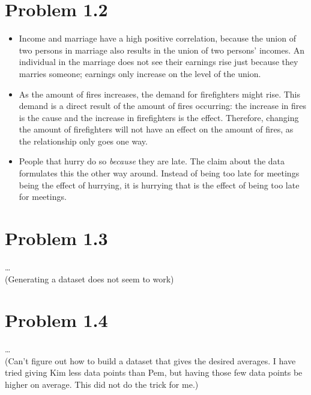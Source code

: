 \documentclass[a4paper]{article}
\begin{document}
\section*{Problem 1.2}
\begin{itemize}
    \item Income and marriage have a high positive correlation, because the union of two persons in marriage also results in the union of two persons' incomes.
    An individual in the marriage does not see their earnings rise just because they marries someone; 
    earnings only increase on the level of the union.
    \item As the amount of fires increases, the demand for firefighters might rise. 
    This demand is a direct result of the amount of fires occurring: the increase in fires is the cause and the increase in firefighters is the effect.
    Therefore, changing the amount of firefighters will not have an effect on the amount of fires, as the relationship only goes one way.
    \item People that hurry do so \textit{because} they are late. 
    The claim about the data formulates this the other way around. 
    Instead of being too late for meetings being the effect of hurrying, 
    it is hurrying that is the effect of being too late for meetings.
\end{itemize}

\section*{Problem 1.3}
\dots\\
(Generating a dataset does not seem to work)

\section*{Problem 1.4}
\dots\\
(Can't figure out how to build a dataset that gives the desired averages. I have tried giving Kim less data points than Pem, but having those few data points be higher on average. This did not do the trick for me.)
\end{document}
